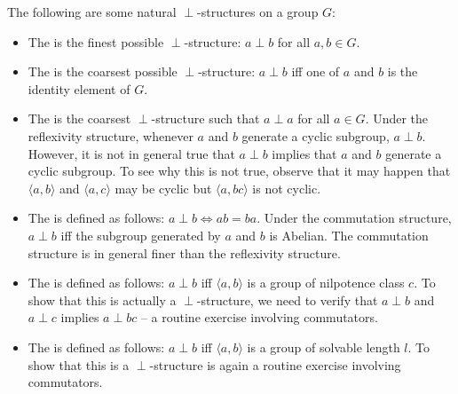 \documentclass[a4paper]{amsart}
\begin{document}
\begin{definer}
  The following are some natural $\perp$-structures on a group $G$:

  \begin{itemize}

  \item The  is the finest possible
    $\perp$-structure: $a \perp b$ for all $a,b \in G$.

  \item The  is the coarsest possible
    $\perp$-structure: $a \perp b$ iff one of $a$ and $b$ is the
    identity element of $G$.

  \item The  is the coarsest
    $\perp$-structure such that $a \perp a $ for all $a \in G$.  Under
    the reflexivity structure, whenever $a$ and $b$ generate a cyclic
    subgroup, $a \perp b$. However, it is not in general true that $a
    \perp b$ implies that $a$ and $b$ generate a cyclic subgroup. To
    see why this is not true, observe that it may happen that $\langle
    a , b \rangle$ and $\langle a, c\rangle$ may be cyclic but
    $\langle a, bc \rangle$ is not cyclic.

  \item The  is defined as follows:
    $a \perp b \iff ab = ba$. Under the commutation structure, $a
    \perp b$ iff the subgroup generated by $a$ and $b$ is Abelian.
    The commutation structure is in general finer than the reflexivity
    structure.

  \item The  is defined as
    follows: $a \perp b$ iff $\langle a,b \rangle$ is a group of
    nilpotence class $c$. To show that this is actually a
    $\perp$-structure, we need to verify that $a \perp b$ and $a \perp
    c$ implies $a \perp bc$ -- a routine exercise involving
    commutators.

  \item The  is defined as
    follows: $a \perp b$ iff $\langle a,b \rangle$ is a group of
    solvable length $l$. To show that this is a $\perp$-structure is
    again a routine exercise involving commutators.

  \end{itemize}
\end{definer}
\end{document}
